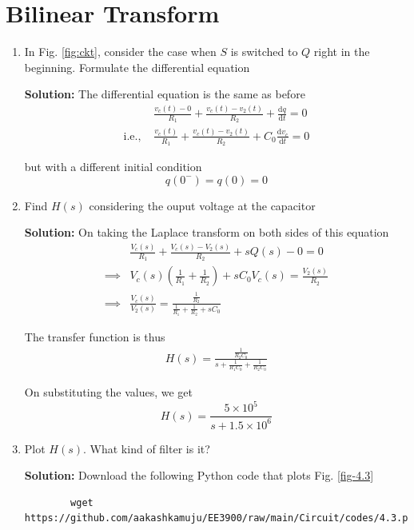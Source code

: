 \documentclass[journal,12pt,twocolumn]{IEEEtran}
\newcommand{\solution}{\noindent \textbf{Solution: }}
\providecommand{\brak}[1]{\ensuremath{\left(#1\right)}}
\providecommand{\der}[1]{\mathrm{d} #1}
\numberwithin{equation}{section}
\numberwithin{figure}{section}
\renewcommand\thesection{\arabic{section}}
\begin{document}
	\section{Bilinear Transform}
	\begin{enumerate}[label=\thesection.\arabic*.,ref=\thesection.\theenumi]
	\item In Fig. \ref{fig:ckt}, consider the case when $S$ is switched to $Q$ right in the beginning. Formulate the differential equation
	
	\solution The differential equation is the same as before 
	\begin{align}
		&\frac{v_c(t) - 0}{R_1} + \frac{v_c(t) - v_2(t)}{R_2} + \frac{\der{q}}{\der{t}} = 0 \\
		\text{i.e., } &\frac{v_c(t)}{R_1} + \frac{v_c(t) - v_2(t)}{R_2} + C_0\frac{\der{v_c}}{\der{t}} = 0
	\end{align}
	
	but with a different initial condition
	\begin{equation}
		q(0^-) = q(0) = 0
	\end{equation}
	
	\item Find $H(s)$ considering the ouput voltage at the capacitor
	
	\solution On taking the Laplace transform on both sides of this equation
	\begin{align}
		&\frac{V_c(s)}{R_1} + \frac{V_c(s) - V_2(s)}{R_2} + sQ(s) - 0 = 0 \\
		\implies &V_c(s) \brak{\frac{1}{R_1} + \frac{1}{R_2}} + sC_0V_c(s) = \frac{V_2(s)}{R_2} \\
		\implies &\frac{V_c(s)}{V_2(s)} = \frac{\frac{1}{R_2}}{\frac{1}{R_1} + \frac{1}{R_2} + sC_0}
	\end{align}
	
	The transfer function is thus
	\begin{align}
		H(s) = \frac{\frac{1}{R_2C_0}}{s + \frac{1}{R_1C_0} + \frac{1}{R_2C_0}}
	\end{align}
	
	On substituting the values, we get
	\begin{equation}
		H(s) = \frac{5 \times 10^5}{s + 1.5 \times 10^6}
	\end{equation}
	
	\item Plot $H(s)$.  What kind of filter is it?
	
	\solution Download the following Python code that plots Fig. \ref{fig-4.3}
	\begin{lstlisting}
		wget https://github.com/aakashkamuju/EE3900/raw/main/Circuit/codes/4.3.py
	\end{lstlisting}
	

\end{enumerate}
\end{document}
